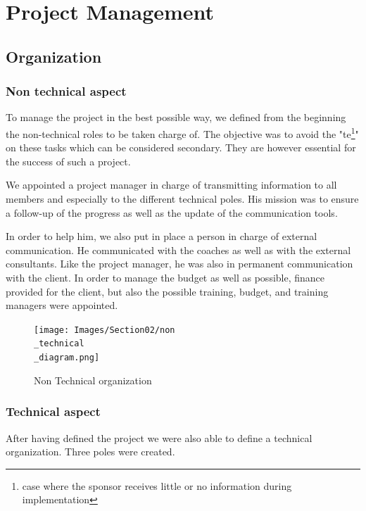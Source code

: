 \section{Project Management}\insertloftspace
\setcounter{figure}{0}\setcounter{table}{0}
\label{ProMan}

\subsection{Organization}
\label{Orga}
\subsubsection{Non technical aspect}

To manage the project in the best possible way, we defined from the beginning the non-technical roles to be taken charge of. The objective was to avoid the "\gls{te}\footnote{case where the sponsor receives little or no information during implementation}" on these tasks which can be considered secondary. They are however essential for the success of such a project. 

\bigbreak
We appointed a project manager in charge of transmitting information to all members and especially to the different technical poles. His mission was to ensure a follow-up of the progress as well as the update of the communication tools. 

\bigbreak
In order to help him, we also put in place a person in charge of external communication. He communicated with the coaches as well as with the external consultants. Like the project manager, he was also in permanent communication with the client. In order to manage the budget as well as possible, finance provided for the client, but also the possible training, budget, and training managers were appointed. 

\begin{figure}[ht]
    \centering
    \texttt{[image: Images/Section02/non\\\_technical\\\_diagram.png]}
    \caption{Non Technical organization}
    \label{fig:nonTechOrga}
\end{figure}

\subsubsection{Technical aspect}

After having defined the project we were also able to define a technical organization. Three poles were created. 

